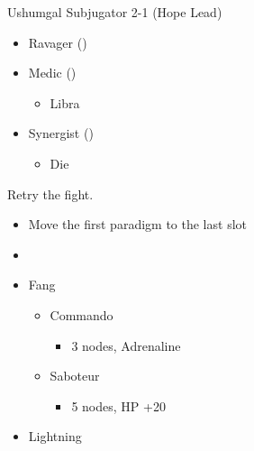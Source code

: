 \renewcommand{\first}{[1] Ravager (\rav)}
\renewcommand{\second}{[2] Medic (\med)}
\renewcommand{\third}{[3] Synergist (\syn)}
\newpage
\begin{multicols}{2}
\begin{battle}{Ushumgal Subjugator 2-1 (Hope Lead)}
\begin{itemize}
    \item \first
    \item \second
    \begin{itemize}
        \item Libra
    \end{itemize}
    \item \third
    \begin{itemize}
        \item Die
    \end{itemize}
\end{itemize}
\end{battle}
Retry the fight.
\begin{menu}
\begin{itemize}
    \paradigm
    \begin{itemize}
        \item Move the first paradigm to the last slot
        \item {}%
{\paradigmline{[\com]}{\com}{\rav}}
{\paradigmline{\com}{\rav}{(\rav)}}%
{\paradigmline[3]{\textit{(\sab)}}{\textit{(\rav)}}{\textit{\rav}}}%
{\paradigmline{\sen}{(\rav)}{(\rav)}}%
{\paradigmline{(\sab)}{(\rav)}{\syn}}%
{\paradigmline{\com}{\rav}{\rav}}
    \end{itemize}
    \crystarium
    \begin{itemize}
        \item Fang
        \begin{itemize}
            \item Commando
            \begin{itemize}
                \item 3 nodes, Adrenaline
            \end{itemize}
            \item Saboteur
            \begin{itemize}
                \item 5 nodes, HP +20
            \end{itemize}
        \end{itemize}
        \item Lightning
        \begin{itemize}

\end{itemize}
\end{itemize}
\end{itemize}
\end{menu}
\end{multicols}
